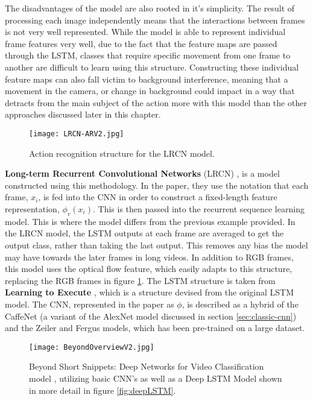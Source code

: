 The disadvantages of the model are also rooted in it's simplicity. The result of processing each image independently means that the interactions between frames is not very well represented. While the model is able to represent individual frame features very well, due to the fact that the feature maps are passed through the LSTM, classes that require specific movement from one frame to another are difficult to learn using this structure. Constructing these individual feature maps can also fall victim to background interference, meaning that a movement in the camera, or change in background could impact in a way that detracts from the main subject of the action more with this model than the other approaches discussed later in this chapter.

\begin{figure}[ht]
	\texttt{[image: LRCN-ARV2.jpg]}
	\centering
	\caption{Action recognition structure for the LRCN model. \cite{LRCNS}}
	\label{fig:lrcn-ar}
\end{figure}

\textbf{Long-term Recurrent Convolutional Networks} (LRCN) \cite{LRCNS}, is a model constructed using this methodology. In the paper, they use the notation that each frame, $x_{i}$, is fed into the CNN in order to construct a fixed-length feature representation, $\phi_{v}(x_{i})$. This is then passed into the recurrent sequence learning model. This is where the model differs from the previous example provided. In the LRCN model, the LSTM outputs at each frame are averaged to get the output class, rather than taking the last output. This removes any bias the model may have towards the later frames in long videos. In addition to RGB frames, this model uses the optical flow feature, which easily adapts to this structure, replacing the RGB frames in figure \ref{fig:lrcn-ar}. The LSTM structure is taken from \textbf{Learning to Execute} \cite{LSTM-2015}, which is a structure devised from the original LSTM model. The CNN, represented in the paper as $\phi$, is described as a hybrid of the CaffeNet \cite{caffenet} (a variant of the AlexNet \cite{alexnet} model discussed in section \ref{sec:classic-cnn}) and the Zeiler and Fergus \cite{zeilerfergus} models, which has been pre-trained on a large dataset.

\begin{figure}[ht]
	\texttt{[image: BeyondOverviewV2.jpg]}
	\centering
	\caption{Beyond Short Snippets: Deep Networks for Video Classification model \cite{beyondshortsnippets}, utilizing basic CNN's as well as a Deep LSTM Model shown in more detail in figure \ref{fig:deepLSTM}.}
	\label{fig:beyondoverview}
\end{figure}

